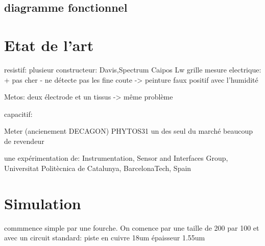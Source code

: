 \documentclass[a4paper,11pt,twoside,openright]{article} %
\begin{document}
\subsection{diagramme fonctionnel}

\section{Etat de l'art}
resistif:
plusieur constructeur:
Davis,Spectrum Caipos Lw
grille mesure electrique:
+ pas cher
- ne détecte pas les fine coute -> peinture
faux positif avec l'humidité

Metos: deux électrode et un tissus -> même problème

capacitif:

Meter (ancienement DECAGON) PHYTOS31 
un des seul du marché beaucoup de revendeur

une expérimentation de: Instrumentation, Sensor and Interfaces Group, Universitat Politècnica de Catalunya, BarcelonaTech, Spain

\section{Simulation}

commmence simple par une fourche. On comence par une taille de 200 par 100 et avec un circuit standard: piste en cuivre 18um  épaisseur 1.55um 
\end{document}
